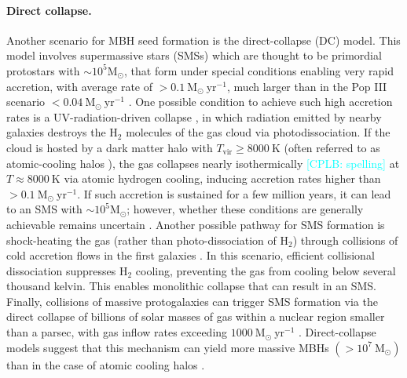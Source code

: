 \documentclass[a4paper,12pt]{article}
\newcommand{\cplb}[1]{\textcolor{cyan}{[CPLB: #1]}}
\begin{document}
\paragraph{Direct collapse.}
Another scenario for MBH seed formation is the direct-collapse (DC) model. This model involves supermassive stars (SMSs) which are thought to be primordial protostars with $\sim10^{5} \mathrm{M}_{\odot}$, that form under special conditions enabling very rapid accretion, with average rate of $>0.1~\mathrm{M}_{\odot}~\mathrm{yr}^{-1}$, much larger than in the Pop III scenario $<0.04~\mathrm{M}_{\odot}~\mathrm{yr}^{-1}$ \cite{sakurai2016supermassive}. One possible condition to achieve such high accretion rates is a UV-radiation-driven collapse \cite{chon2016cosmological,regan2017rapid}, in which radiation emitted by nearby galaxies destroys the $\mathrm{H}_{2}$ molecules of the gas cloud via photodissociation. If the cloud is hosted by a dark matter halo with $T_{\mathrm{vir}} \geq 8000~\mathrm{K}$ (often referred to as atomic-cooling halos \cite{tanaka2009assembly}), the gas collapses nearly isothermically \cplb{spelling} at $T \approx 8000~\mathrm{K}$ via atomic hydrogen cooling, inducing accretion rates higher than $>0.1~\mathrm{M}_{\odot}~\mathrm{yr}^{-1}$. If such accretion is sustained for a few million years, it can lead to an SMS with $\sim10^{5} \mathrm{M}_{\odot}$; however, whether these conditions are generally achievable remains uncertain \cite{amaro2023astrophysics}. Another possible pathway for SMS formation is shock-heating the gas (rather than photo-dissociation of $\mathrm{H}_{2}$) through collisions of cold accretion flows in the first galaxies \cite{inayoshi2012supermassive}. In this scenario, efficient collisional dissociation suppresses $\mathrm{H}_{2}$ cooling, preventing the gas from cooling below several thousand kelvin. This enables monolithic collapse that can result in an SMS. Finally, collisions of massive protogalaxies can trigger SMS formation via the direct collapse of billions of solar masses of gas within a nuclear region smaller than a parsec, with gas inflow rates exceeding $1000 ~\mathrm{M}_{\odot}~\mathrm{yr}^{-1}$ \cite{mayer2010direct, mayer2015direct}. Direct-collapse models suggest that this mechanism can yield more massive MBHs $(>10^7 ~\mathrm{M}_{\odot})$ than in the case of atomic cooling halos \cite{haemmerle2021maximum}. 
\end{document}
